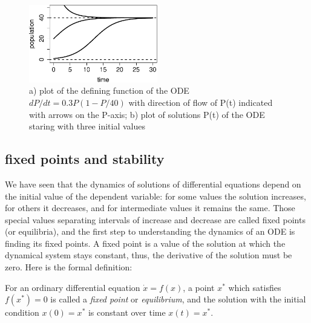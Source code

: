 \documentclass[
  letterpaper,
  DIV=11,
  numbers=noendperiod]{scrreprt}
\begin{document}
\begin{figure}

{\centering \includegraphics[width=0.5\textwidth,height=\textheight]{./graph_odes_files/figure-pdf/ch7-flow2-2.pdf}

}

\caption{a) plot of the defining function of the ODE
\(dP/dt = 0.3P(1-P/40)\) with direction of flow of P(t) indicated with
arrows on the P-axis; b) plot of solutions P(t) of the ODE staring with
three initial values}

\end{figure}

\hypertarget{fixed-points-and-stability}{%
\subsection{fixed points and
stability}\label{fixed-points-and-stability}}

We have seen that the dynamics of solutions of differential equations
depend on the initial value of the dependent variable: for some values
the solution increases, for others it decreases, and for intermediate
values it remains the same. Those special values separating intervals of
increase and decrease are called fixed points (or equilibria), and the
first step to understanding the dynamics of an ODE is finding its fixed
points. A fixed point is a value of the solution at which the dynamical
system stays constant, thus, the derivative of the solution must be
zero. Here is the formal definition:

\begin{tcolorbox}[enhanced jigsaw, coltitle=black, arc=.35mm, opacitybacktitle=0.6, breakable, bottomtitle=1mm, toptitle=1mm, titlerule=0mm, colback=white, leftrule=.75mm, rightrule=.15mm, colframe=quarto-callout-note-color-frame, colbacktitle=quarto-callout-note-color!10!white, opacityback=0, title=\textcolor{quarto-callout-note-color}{\faInfo}\hspace{0.5em}{Definition}, left=2mm, toprule=.15mm, bottomrule=.15mm]

For an ordinary differential equation \(\dot x = f(x)\), a point \(x^*\)
which satisfies \(f(x^*)=0\) is called a \emph{fixed point} or
\emph{equilibrium}, and the solution with the initial condition
\(x(0)=x^*\) is constant over time \(x(t)=x^*\).

\end{tcolorbox}
\end{document}
